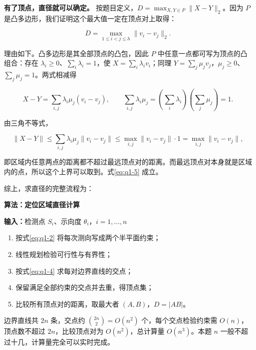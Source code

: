 \textbf{有了顶点，直径就可以确定。} 按题目定义，$D=\max_{X,Y\in P}\|X-Y\|_2$。因为 $P$ 是凸多边形，我们证明这个最大值一定在顶点对上取得：

\begin{equation}\label{eq:q1-5}
D=\max_{1\le i<j\le h}\|v_i-v_j\|_2 .
\end{equation}

理由如下。凸多边形是其全部顶点的凸包，因此 $P$ 中任意一点都可写为顶点的凸组合：存在 $\lambda_i\ge0$、$\sum_i\lambda_i=1$，使 $X=\sum_i\lambda_iv_i$；同理 $Y=\sum_j\mu_jv_j$，$\mu_j\ge0$、$\sum_j\mu_j=1$。两式相减得

\[
X-Y=\sum_{i,j}\lambda_i\mu_j(v_i-v_j),
\qquad
\sum_{i,j}\lambda_i\mu_j=\left(\sum_i\lambda_i\right)\left(\sum_j\mu_j\right)=1 .
\]

由三角不等式，

\[
\|X-Y\|\le\sum_{i,j}\lambda_i\mu_j\|v_i-v_j\|\le\max_{i,j}\|v_i-v_j\|\cdot1=\max_{i,j}\|v_i-v_j\|,
\]

即区域内任意两点的距离都不超过最远顶点对的距离。而最远顶点对本身就是区域内的点，所以这个上界可以取到。式\eqref{eq:q1-5} 成立。

综上，求直径的完整流程为：

\par\medskip
\noindent\begin{minipage}{\linewidth}
\small
{}\label{alg:q1-diameter}
\textbf{算法\thealgorithm：定位区域直径计算}\par\smallskip
\noindent\textbf{输入：}检测点 $S_i$、示向度 $\theta_i$，$i=1,\dots,n$
\begin{enumerate}
\setlength{\itemsep}{2pt}
\setlength{\parskip}{0pt}
\item 按式\eqref{eq:q1-2} 将每次测向写成两个半平面约束；
\item 线性规划检验可行性与有界性；
\item 按式\eqref{eq:q1-4} 求每对边界直线的交点；
\item 保留满足全部约束的交点并去重，得顶点集；
\item 比较所有顶点对的距离，取最大者 $(A,B)$，$D=|AB|$。
\end{enumerate}
\end{minipage}
\par\medskip

边界直线共 $2n$ 条，交点约 $\binom{2n}{2}=O(n^2)$ 个，每个交点检验约束需 $O(n)$，顶点数不超过 $2n$，比较顶点对为 $O(n^2)$，总计算量 $O(n^3)$。本题 $n$ 一般不超过十几，计算量完全可以实时完成。

